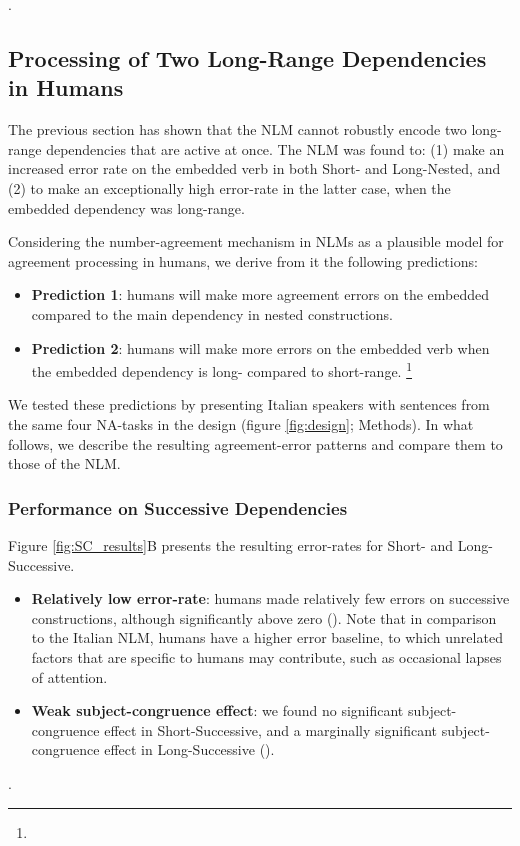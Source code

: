 .

\subsection{Processing of Two Long-Range Dependencies in Humans}
The previous section has shown that the NLM cannot robustly encode two long-range dependencies that are active at once. The NLM was found to: (1) make an increased error rate on the embedded verb in both Short- and Long-Nested, and (2) to make an exceptionally high error-rate in the latter case, when the embedded dependency was long-range.

Considering the number-agreement mechanism in NLMs as a plausible model for agreement processing in humans, we derive from it the following predictions:

\begin{itemize}
    \item \textbf{Prediction 1}: humans will make more agreement errors on the embedded compared to the main dependency in nested constructions. 
    \item \textbf{Prediction 2}: humans will make more errors on the embedded verb when the embedded dependency is long- compared to short-range. \footnote{}

\end{itemize}
We tested these predictions by presenting Italian speakers with sentences from the same four NA-tasks in the design (figure \ref{fig:design}; Methods). In what follows, we describe the resulting agreement-error patterns and compare them to those of the NLM.

\subsubsection{Performance on Successive Dependencies}
Figure \ref{fig:SC_results}B presents the resulting error-rates for Short- and Long-Successive. 
\begin{itemize}
    \item \textbf{Relatively low error-rate}: humans made relatively few errors on successive constructions, although significantly above zero (). Note that in comparison to the Italian NLM, humans have a higher error baseline, to which unrelated factors that are specific to humans may contribute, such as occasional lapses of attention.
    \item \textbf{Weak subject-congruence effect}: we found no significant subject-congruence effect in Short-Successive, and a marginally significant subject-congruence effect in Long-Successive ().
\end{itemize}
.

